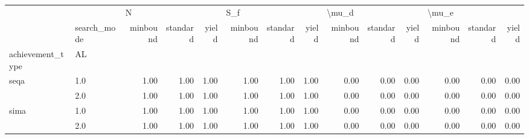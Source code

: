 \begin{tabular}{llrrrrrrrrrrrr}
\toprule
     & {} & \multicolumn{3}{l}{N} & \multicolumn{3}{l}{S\_f} & \multicolumn{3}{l}{\textbackslash mu\_d} & \multicolumn{3}{l}{\textbackslash mu\_e} \\
     & search\_mode & minbound & standard & yield & minbound & standard & yield & minbound & standard & yield & minbound & standard & yield \\
achievement\_type & AL &          &          &       &          &          &       &          &          &       &          &          &       \\
\midrule
seqa & 1.0 &     1.00 &     1.00 &  1.00 &     1.00 &     1.00 &  1.00 &     0.00 &     0.00 &  0.00 &     0.00 &     0.00 &  0.00 \\
     & 2.0 &     1.00 &     1.00 &  1.00 &     1.00 &     1.00 &  1.00 &     0.00 &     0.00 &  0.00 &     0.00 &     0.00 &  0.00 \\
sima & 1.0 &     1.00 &     1.00 &  1.00 &     1.00 &     1.00 &  1.00 &     0.00 &     0.00 &  0.00 &     0.00 &     0.00 &  0.00 \\
     & 2.0 &     1.00 &     1.00 &  1.00 &     1.00 &     1.00 &  1.00 &     0.00 &     0.00 &  0.00 &     0.00 &     0.00 &  0.00 \\
\bottomrule
\end{tabular}
